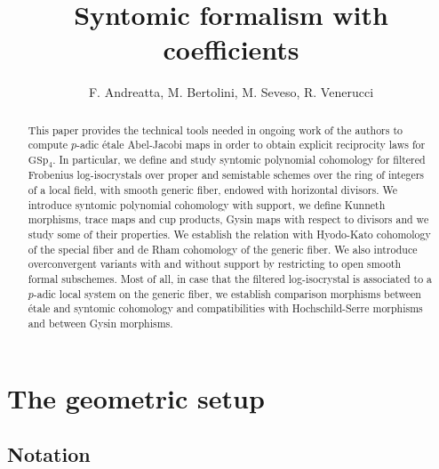 \documentclass[asterisque,english]{smfart}
\author{F. Andreatta, M. Bertolini, M. Seveso, R. Venerucci}
\title{Syntomic formalism with coefficients}
\begin{document}
\maketitle

\begin{abstract} This paper provides the technical tools needed in ongoing work of the authors to compute $p$-adic \'etale Abel-Jacobi maps in order to obtain explicit reciprocity laws for $\mathrm{GSp}_4$. In particular, we define and study syntomic polynomial cohomology for filtered Frobenius log-isocrystals over proper and semistable schemes over the ring of integers of a local field, with smooth generic fiber, endowed with horizontal divisors. We introduce syntomic polynomial cohomology with support, we define Kunneth morphisms, trace maps and cup products,  Gysin maps with respect to divisors and we study some of their properties. We establish the relation with Hyodo-Kato cohomology of the special fiber and de Rham cohomology of the generic fiber. We also introduce overconvergent variants with and without support by restricting to open smooth formal subschemes. Most of all, in case that the filtered log-isocrystal is associated to a $p$-adic local system on the generic fiber, we establish comparison morphisms between \'etale and syntomic cohomology and compatibilities with Hochschild-Serre morphisms and between Gysin morphisms. 



\end{abstract}

\tableofcontents



\section{The geometric setup}


\subsection{Notation}\label{sub:not}
\end{document}
